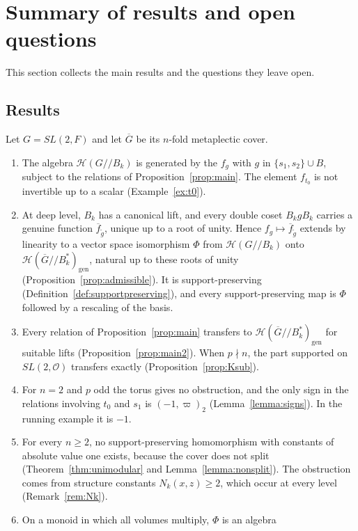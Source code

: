 \documentclass[12pt,letterpaper]{amsart}
\numberwithin{equation}{section}
\theoremstyle{definition}
\theoremstyle{remark}
\newcommand{\cO}{\mathcal{O}}
\newcommand{\cH}{\mathcal{H}}
\newcommand{\Gbar}{\overline{G}}
\newcommand{\gen}{\mathrm{gen}}
\newcommand{\fbar}{\overline{f}}
\newcommand{\Hgen}{\cH(\Gbar/\!/B_k^*)_{\gen}}
\newcommand{\Hlin}{\cH(G/\!/B_k)}
\begin{document}
\section{Summary of results and open questions}
\label{section:summary}

This section collects the main results and the questions they leave
open.

\subsection*{Results}
Let $G=SL(2,F)$ and let $\Gbar$ be its $n$-fold metaplectic cover.
\begin{enumerate}[leftmargin=2em]
\item The algebra $\Hlin$ is generated by the $f_g$ with $g$ in
$\{s_1,s_2\}\cup B$, subject to the relations of
Proposition~\ref{prop:main}. The element $f_{t_0}$ is not invertible
up to a scalar (Example~\ref{ex:t0}).
\item At deep level, $B_k$ has a canonical lift, and every double coset
$B_kgB_k$ carries a genuine function $\fbar_{\tilde g}$, unique up to a
root of unity. Hence $f_g\mapsto\fbar_{\tilde g}$ extends by linearity
to a vector space isomorphism $\Phi$ from $\Hlin$ onto $\Hgen$, natural up to
these roots of unity (Proposition~\ref{prop:admissible}). It is
support-preserving (Definition~\ref{def:supportpreserving}), and every
support-preserving map is $\Phi$ followed by a rescaling of the basis.
\item Every relation of Proposition~\ref{prop:main} transfers to
$\Hgen$ for suitable lifts (Proposition~\ref{prop:main2}). When
$p\nmid n$, the part supported on $SL(2,\cO)$ transfers exactly
(Proposition~\ref{prop:Ksub}).
\item For $n=2$ and $p$ odd the torus gives no obstruction, and the
only sign in the relations involving $t_0$ and $s_1$ is $(-1,\varpi)_2$
(Lemma~\ref{lemma:signs}). In the running example it is $-1$.
\item For every $n\geq 2$, no support-preserving homomorphism with
constants of absolute value one exists, because the cover does not
split (Theorem~\ref{thm:unimodular} and Lemma~\ref{lemma:nonsplit}).
The obstruction comes from structure constants $N_k(x,z)\geq2$, which
occur at every level (Remark~\ref{rem:Nk}).
\item On a monoid in which all volumes multiply, $\Phi$ is an algebra

\end{enumerate}
\end{document}
